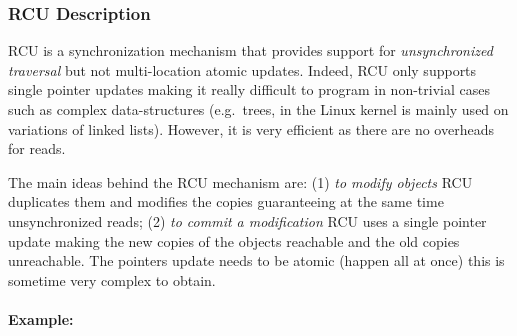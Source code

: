 \begin{refsection}
\subsubsection*{RCU Description}
\label{sec:member411}
RCU is a synchronization mechanism that provides support for
\emph{unsynchronized traversal} but not multi-location atomic updates.
%
Indeed, RCU only supports single pointer updates making it really difficult to
program in non-trivial cases such as complex data-structures (e.g.\ trees, in
the Linux kernel is mainly used on variations of linked lists).
%
However, it is very efficient as there are no overheads for reads.

The main ideas behind the RCU mechanism are: (1) \emph{to modify objects} RCU
duplicates them and modifies the copies guaranteeing at the same time
unsynchronized reads; (2) \emph{to commit a modification} RCU uses a single
pointer update making the new copies of the objects reachable and the old
copies unreachable.
%
The pointers update needs to be atomic (happen all at once) this is sometime
very complex to obtain.

\paragraph*{Example:}


\end{refsection}
